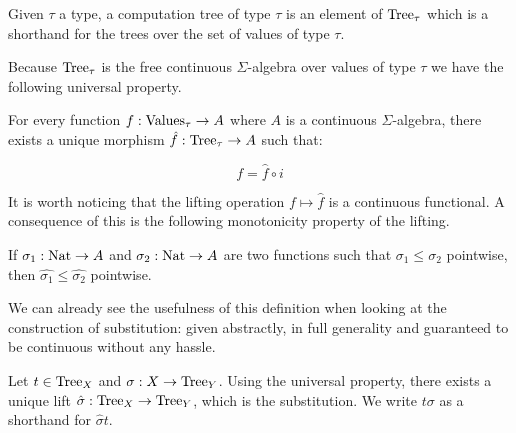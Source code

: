 \begin{adefinition}
    Given $\tau$ a type, a computation tree of type $\tau$
    is an element of $\textnormal{Tree}_{\tau}$ which 
    is a shorthand for the trees over the set of 
    values of type $\tau$.

    Because $\textnormal{Tree}_\tau$ is the free
    continuous $\Sigma$-algebra over values of type $\tau$
    we have the following universal property. 

    For every function $f : \textnormal{Values}_\tau \to A$ where 
    $A$ is a continuous $\Sigma$-algebra,
    there exists a unique morphism $\hat{f} : \textnormal{Tree}_\tau \to A$
    such that:

    \begin{equation*}
        f = \hat{f} \circ i
    \end{equation*}

    \begin{center}
    \end{center}
\end{adefinition}

It is worth noticing that the lifting operation $f \mapsto \hat{f}$ is
a continuous functional. A consequence of this is the following monotonicity 
property of the lifting.

\begin{alemma}
    \label{lem:orderpreservinglift}
    If $\sigma_1 : \textnormal{Nat} \to A$ and $\sigma_2 : \textnormal{Nat} \to A$ 
    are two functions such that $\sigma_1 \leq \sigma_2$ pointwise,
    then $\hat{\sigma_1} \leq \hat{\sigma_2}$ pointwise.
\end{alemma}

We can already see the usefulness of this definition 
when looking at the construction of substitution:
given abstractly, in full generality and 
guaranteed to be continuous without any hassle. 

\begin{adefinition}[Substitution]
    Let $t \in \textnormal{Tree}_X$ 
    and $\sigma : X \to \textnormal{Tree}_Y$.
    Using the universal property, there exists a
    unique lift $\hat{\sigma} : \textnormal{Tree}_X \to \textnormal{Tree}_Y$,
    which is the substitution. We write $t\sigma$ as a shorthand for 
    $\hat{\sigma}t$.
\end{adefinition}

